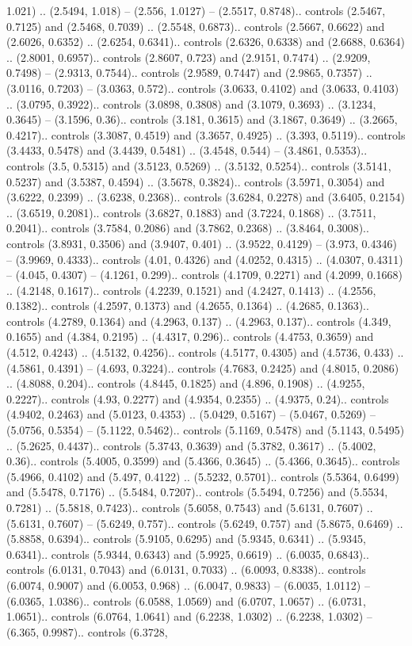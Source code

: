 1.021) .. (2.5494, 1.018) -- (2.556, 1.0127) -- (2.5517, 0.8748).. controls (2.5467, 0.7125) and (2.5468, 0.7039) .. (2.5548, 0.6873).. controls (2.5667, 0.6622) and (2.6026, 0.6352) .. (2.6254, 0.6341).. controls (2.6326, 0.6338) and (2.6688, 0.6364) .. (2.8001, 0.6957).. controls (2.8607, 0.723) and (2.9151, 0.7474) .. (2.9209, 0.7498) -- (2.9313, 0.7544).. controls (2.9589, 0.7447) and (2.9865, 0.7357) .. (3.0116, 0.7203) -- (3.0363, 0.572).. controls (3.0633, 0.4102) and (3.0633, 0.4103) .. (3.0795, 0.3922).. controls (3.0898, 0.3808) and (3.1079, 0.3693) .. (3.1234, 0.3645) -- (3.1596, 0.36).. controls (3.181, 0.3615) and (3.1867, 0.3649) .. (3.2665, 0.4217).. controls (3.3087, 0.4519) and (3.3657, 0.4925) .. (3.393, 0.5119).. controls (3.4433, 0.5478) and (3.4439, 0.5481) .. (3.4548, 0.544) -- (3.4861, 0.5353).. controls (3.5, 0.5315) and (3.5123, 0.5269) .. (3.5132, 0.5254).. controls (3.5141, 0.5237) and (3.5387, 0.4594) .. (3.5678, 0.3824).. controls (3.5971, 0.3054) and (3.6222, 0.2399) .. (3.6238, 0.2368).. controls (3.6284, 0.2278) and (3.6405, 0.2154) .. (3.6519, 0.2081).. controls (3.6827, 0.1883) and (3.7224, 0.1868) .. (3.7511, 0.2041).. controls (3.7584, 0.2086) and (3.7862, 0.2368) .. (3.8464, 0.3008).. controls (3.8931, 0.3506) and (3.9407, 0.401) .. (3.9522, 0.4129) -- (3.973, 0.4346) -- (3.9969, 0.4333).. controls (4.01, 0.4326) and (4.0252, 0.4315) .. (4.0307, 0.4311) -- (4.045, 0.4307) -- (4.1261, 0.299).. controls (4.1709, 0.2271) and (4.2099, 0.1668) .. (4.2148, 0.1617).. controls (4.2239, 0.1521) and (4.2427, 0.1413) .. (4.2556, 0.1382).. controls (4.2597, 0.1373) and (4.2655, 0.1364) .. (4.2685, 0.1363).. controls (4.2789, 0.1364) and (4.2963, 0.137) .. (4.2963, 0.137).. controls (4.349, 0.1655) and (4.384, 0.2195) .. (4.4317, 0.296).. controls (4.4753, 0.3659) and (4.512, 0.4243) .. (4.5132, 0.4256).. controls (4.5177, 0.4305) and (4.5736, 0.433) .. (4.5861, 0.4391) -- (4.693, 0.3224).. controls (4.7683, 0.2425) and (4.8015, 0.2086) .. (4.8088, 0.204).. controls (4.8445, 0.1825) and (4.896, 0.1908) .. (4.9255, 0.2227).. controls (4.93, 0.2277) and (4.9354, 0.2355) .. (4.9375, 0.24).. controls (4.9402, 0.2463) and (5.0123, 0.4353) .. (5.0429, 0.5167) -- (5.0467, 0.5269) -- (5.0756, 0.5354) -- (5.1122, 0.5462).. controls (5.1169, 0.5478) and (5.1143, 0.5495) .. (5.2625, 0.4437).. controls (5.3743, 0.3639) and (5.3782, 0.3617) .. (5.4002, 0.36).. controls (5.4005, 0.3599) and (5.4366, 0.3645) .. (5.4366, 0.3645).. controls (5.4966, 0.4102) and (5.497, 0.4122) .. (5.5232, 0.5701).. controls (5.5364, 0.6499) and (5.5478, 0.7176) .. (5.5484, 0.7207).. controls (5.5494, 0.7256) and (5.5534, 0.7281) .. (5.5818, 0.7423).. controls (5.6058, 0.7543) and (5.6131, 0.7607) .. (5.6131, 0.7607) -- (5.6249, 0.757).. controls (5.6249, 0.757) and (5.8675, 0.6469) .. (5.8858, 0.6394).. controls (5.9105, 0.6295) and (5.9345, 0.6341) .. (5.9345, 0.6341).. controls (5.9344, 0.6343) and (5.9925, 0.6619) .. (6.0035, 0.6843).. controls (6.0131, 0.7043) and (6.0131, 0.7033) .. (6.0093, 0.8338).. controls (6.0074, 0.9007) and (6.0053, 0.968) .. (6.0047, 0.9833) -- (6.0035, 1.0112) -- (6.0365, 1.0386).. controls (6.0588, 1.0569) and (6.0707, 1.0657) .. (6.0731, 1.0651).. controls (6.0764, 1.0641) and (6.2238, 1.0302) .. (6.2238, 1.0302) -- (6.365, 0.9987).. controls (6.3728, 